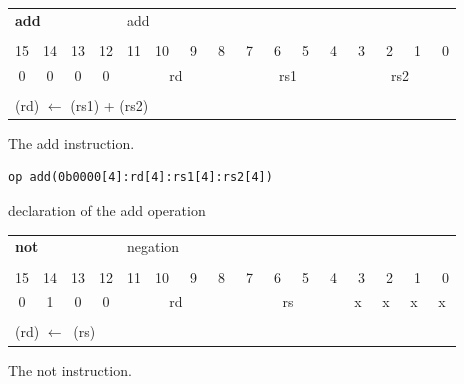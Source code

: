 \begin{figure}[h!tb]
\begin{center}
	\begin{tabular}{cccccccccccccccc}
		\multicolumn{4}{l}{\Large{\bf{add}}} & \multicolumn{12}{l}{add}\\
		\multicolumn{16}{c}{}\\
		15  &  14  &  13  &  12  &  11  &  10  &  ~9  & ~8  &  ~7  &  ~6  &  ~5  &  ~4  &  ~3  &  ~2  &  ~1  &  ~0 \\
		\hline
			\multicolumn{1}{|c|}{0}  & \multicolumn{1}{|c|}{0} & \multicolumn{1}{|c|}{0} & \multicolumn{1}{|c|}{0} & \multicolumn{4}{|c|}{rd} & \multicolumn{4}{|c|}{rs1} & \multicolumn{4}{|c|}{rs2}\\
		\hline
		\multicolumn{16}{c}{}\\
		\multicolumn{16}{l}{(rd) $\leftarrow$ (rs1) + (rs2)}\\
	\end{tabular}
\end{center}
\caption{The add instruction.}
\label{add_instr}
\end{figure}

\begin{figure}[h!tb]
\begin{center}
\begin{verbatim}
op add(0b0000[4]:rd[4]:rs1[4]:rs2[4])
\end{verbatim}
\label{add_decl}
\caption{declaration of the add operation}
\end{center}
\end{figure}

\begin{figure}[h!tb]
\begin{center}
	\begin{tabular}{cccccccccccccccc}
		\multicolumn{4}{l}{\Large{\bf{not}}} & \multicolumn{12}{l}{negation}\\
		\multicolumn{16}{c}{}\\
		15  &  14  &  13  &  12  &  11  &  10  &  ~9  & ~8  &  ~7  &  ~6  &  ~5  &  ~4  &  ~3  &  ~2  &  ~1  &  ~0 \\
		\hline
		\multicolumn{1}{|c|}{0}  & \multicolumn{1}{|c|}{1} & \multicolumn{1}{|c|}{0} & \multicolumn{1}{|c|}{0} & \multicolumn{4}{|c|}{rd} & \multicolumn{4}{|c|}{rs} & \multicolumn{1}{|c|}{x} & \multicolumn{1}{|c|}{x} & \multicolumn{1}{|c|}{x} & \multicolumn{1}{|c|}{x}\\
		\hline
		\multicolumn{16}{c}{}\\
		\multicolumn{16}{l}{(rd) $\leftarrow$ $~$(rs)}\\
	\end{tabular}
\end{center}
\caption{The not instruction.}
\label{not_instr}
\end{figure}

